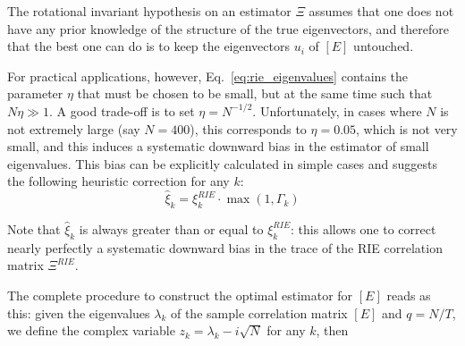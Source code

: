 The rotational invariant hypothesis on an estimator $\Xi$ assumes that one does not have any prior knowledge of the structure of the true eigenvectors, and therefore that the best one can do is to keep the eigenvectors $u_i$ of $[E]$ untouched.

For practical applications, however, Eq.~\ref{eq:rie_eigenvalues} contains the parameter $\eta$ that must be chosen to be small, but at the same time such that $N\eta \gg 1$. A good trade-off is to set $\eta = N^{-1/2}$. Unfortunately, in cases where $N$ is not extremely large (say $N = 400$), this corresponds to $\eta = 0.05$, which is not very small, and this induces a systematic downward bias in the estimator of small
eigenvalues. This bias can be explicitly calculated in simple cases and suggests the following heuristic correction for any $k$:
\begin{equation}
\hat{\xi}_k = \xi^{RIE}_k \cdot \max(1, \Gamma_k)
\end{equation}

Note that $\hat{\xi}_k$ is always greater than or equal to $\xi^{RIE}_k$: this allows one to correct nearly perfectly a systematic
downward bias in the trace of the RIE correlation matrix $\Xi^{RIE}$.

The complete procedure to construct the optimal estimator for $[E]$ reads as this: given the eigenvalues $\lambda_k$ of the sample correlation matrix $[E]$ and $q=N/T$, we define the complex variable $z_k =\lambda_k-i\sqrt{N}$ for any $k$, then

